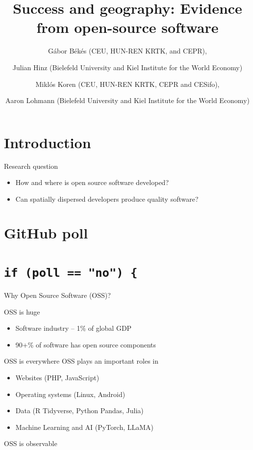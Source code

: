 \documentclass[
  ignorenonframetext,
  aspectratio=1610,
]{beamer}
\title{Success and geography: Evidence from open-source software}
\author{Gábor Békés (CEU, HUN-REN KRTK, and CEPR), \and Julian Hinz
(Bielefeld University and Kiel Institute for the World
Economy) \and Miklós Koren (CEU, HUN-REN KRTK, CEPR and
CESifo), \and Aaron Lohmann (Bielefeld University and Kiel Institute for
the World Economy)}
\date{April 20, 2024\footnote<.->{This work was funded by the European
  Union under the Horizon Europe grant 101061123. Views and opinions
  expressed are, however, those of the author(s) only and do not
  necessarily reflect those of the European Union or the European
  Commission. Neither the European Union nor the granting authority can
  be held responsible for them.}}
\providecommand{\tightlist}{%
  \setlength{\itemsep}{0pt}\setlength{\parskip}{0pt}}
\begin{document}
\frame{\titlepage}

\section{Introduction}\label{introduction}

\begin{frame}{Research question}
\protect\hypertarget{research-question}{}
\begin{itemize}
\tightlist
\item
  How and where is open source software developed?
\item
  Can spatially dispersed developers produce quality software?
\end{itemize}
\end{frame}

\section{GitHub poll}\label{github-poll}

\section{\texorpdfstring{\texttt{if\ (poll\ ==\ "no")\ \{}}{if (poll == "no") \{}}\label{if-poll-no}

\begin{frame}{Why Open Source Software (OSS)?}
\protect\hypertarget{why-open-source-software-oss}{}
\begin{block}{OSS is huge}
\protect\hypertarget{oss-is-huge}{}
\begin{itemize}
\tightlist
\item
  Software industry -- 1\% of global GDP
\item
  90+\% of software has open source components
\end{itemize}
\end{block}

\begin{block}{OSS is everywhere}
\protect\hypertarget{oss-is-everywhere}{}
OSS plays an important roles in

\begin{itemize}
\tightlist
\item
  Websites (PHP, JavaScript)
\item
  Operating systems (Linux, Android)
\item
  Data (R Tidyverse, Python Pandas, Julia)
\item
  Machine Learning and AI (PyTorch, LLaMA)
\end{itemize}
\end{block}

\begin{block}{OSS is observable}
\protect\hypertarget{oss-is-observable}{}
\end{block}
\end{frame}
\end{document}
